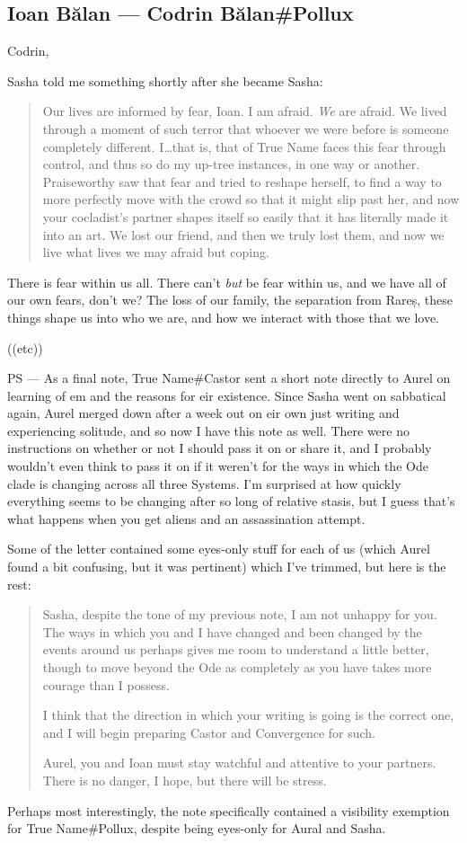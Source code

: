 \hypertarget{ioan-bux103lan-codrin-bux103lanpollux}{%
\subsection{Ioan Bălan — Codrin Bălan\#Pollux}\label{ioan-bux103lan-codrin-bux103lanpollux}}

Codrin,

Sasha told me something shortly after she became Sasha:

\begin{quote}
Our lives are informed by fear, Ioan. I am afraid. \emph{We} are afraid. We lived through a moment of such terror that whoever we were before is someone completely different. I\ldots that is, that of True Name faces this fear through control, and thus so do my up-tree instances, in one way or another. Praiseworthy saw that fear and tried to reshape herself, to find a way to more perfectly move with the crowd so that it might slip past her, and now your cocladist's partner shapes itself so easily that it has literally made it into an art. We lost our friend, and then we truly lost them, and now we live what lives we may afraid but coping.
\end{quote}

There is fear within us all. There can't \emph{but} be fear within us, and we have all of our own fears, don't we? The loss of our family, the separation from Rareș, these things shape us into who we are, and how we interact with those that we love.

((etc))

PS — As a final note, True Name\#Castor sent a short note directly to Aurel on learning of em and the reasons for eir existence. Since Sasha went on sabbatical again, Aurel merged down after a week out on eir own just writing and experiencing solitude, and so now I have this note as well. There were no instructions on whether or not I should pass it on or share it, and I probably wouldn't even think to pass it on if it weren't for the ways in which the Ode clade is changing across all three Systems. I'm surprised at how quickly everything seems to be changing after so long of relative stasis, but I guess that's what happens when you get aliens and an assassination attempt.

Some of the letter contained some eyes-only stuff for each of us (which Aurel found a bit confusing, but it was pertinent) which I've trimmed, but here is the rest:

\begin{quote}
Sasha, despite the tone of my previous note, I am not unhappy for you. The ways in which you and I have changed and been changed by the events around us perhaps gives me room to understand a little better, though to move beyond the Ode as completely as you have takes more courage than I possess.

I think that the direction in which your writing is going is the correct one, and I will begin preparing Castor and Convergence for such.

Aurel, you and Ioan must stay watchful and attentive to your partners. There is no danger, I hope, but there will be stress.
\end{quote}

Perhaps most interestingly, the note specifically contained a visibility exemption for True Name\#Pollux, despite being eyes-only for Aural and Sasha.
